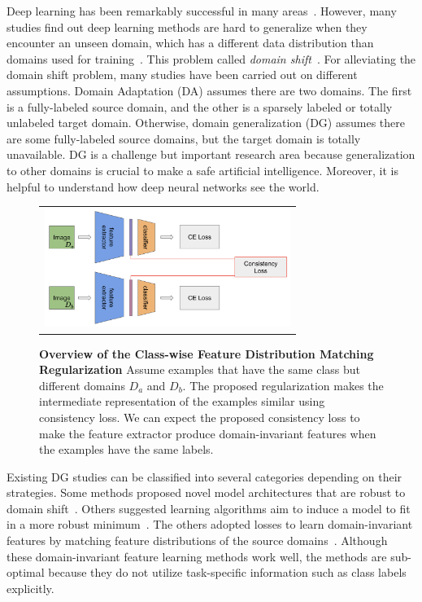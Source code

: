 Deep learning has been remarkably successful in many areas~\cite{Girshick2014, Krizhevsky2012, Ren2017, Shelhamer2017}. However, many studies find out deep learning methods are hard to generalize when they encounter an unseen domain, which has a different data distribution than domains used for training~\cite{Li2018MLDG, Li2017dg, Li2018MLDG, shankar2018generalizing, ganin2015unsupervised, bousmalis2016domain, motiian2017CCSA}. This problem called \textit{domain shift}~\cite{Shimodaira2000}. For alleviating the domain shift problem, many studies have been carried out on different assumptions. Domain Adaptation (DA) assumes there are two domains. The first is a fully-labeled source domain, and the other is a sparsely labeled or totally unlabeled target domain. Otherwise, domain generalization (DG) assumes there are some fully-labeled source domains, but the target domain is totally unavailable. DG is a challenge but important research area because generalization to other domains is crucial to make a safe artificial intelligence. Moreover, it is helpful to understand how deep neural networks see the world.

\begin{figure}[t]
	\centering
	\footnotesize
	\begin{tabular}{c}
		\includegraphics[width=8cm]{figures/model.png}
	\end{tabular}
	\caption{\textbf{Overview of the Class-wise Feature Distribution Matching Regularization} Assume examples that have the same class but different domains $D_a$ and $D_b$. The proposed regularization makes the intermediate representation of the examples similar using consistency loss. We can expect the proposed consistency loss to make the feature extractor produce domain-invariant features when the examples have the same labels.}\label{fig:overview}
\end{figure}

Existing DG studies can be classified into several categories depending on their strategies. Some methods proposed novel model architectures that are robust to domain shift~\cite{Khosla12undobias, Li2017dg}. Others suggested learning algorithms aim to induce a model to fit in a more robust minimum~\cite{li2019episodic, Li2018MLDG, NIPS2018_metareg}. The others adopted losses to learn domain-invariant features by matching feature distributions of the source domains~\cite{Ghifary2015mtae, muandet2013domaingeneralization, mmdaaecvpr2018}. Although these domain-invariant feature learning methods work well, the methods are sub-optimal because they do not utilize task-specific information such as class labels explicitly.

